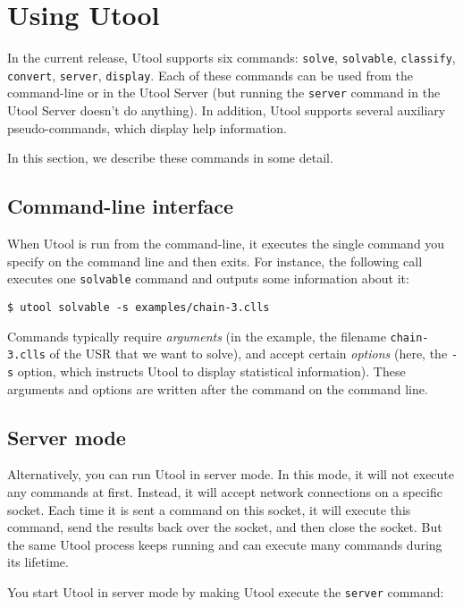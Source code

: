 
\section{Using Utool}  \label{sec:operations}

In the current release, Utool supports six commands: \verb?solve?,
\verb?solvable?, \verb?classify?, \verb?convert?, \verb?server?,
\verb?display?. Each of these commands can be used from the
command-line or in the Utool Server (but running the \verb?server?
command in the Utool Server doesn't do anything). In addition, Utool
supports several auxiliary pseudo-commands, which display help
information. 

In this section, we describe these commands in some detail.


\subsection{Command-line interface}
When Utool is run from the command-line, it executes the single
command you specify on the command line and then exits. For instance,
the following call executes one \verb?solvable? command and outputs
some information about it:

\begin{verbatim}
$ utool solvable -s examples/chain-3.clls
\end{verbatim}

Commands typically require \emph{arguments} (in the example, the
filename \verb?chain-3.clls? of the USR that we want to solve), and
accept certain \emph{options} (here, the \verb?-s? option, which
instructs Utool to display statistical information). These arguments
and options are written after the command on the command line.


\subsection{Server mode} \label{sec:operations-server}

Alternatively, you can run Utool in server mode. In this mode, it will
not execute any commands at first. Instead, it will accept network
connections on a specific socket. Each time it is sent a command on
this socket, it will execute this command, send the results back over
the socket, and then close the socket. But the same Utool process
keeps running and can execute many commands during its lifetime. 

You start Utool in server mode by making Utool execute the
\verb?server? command:

